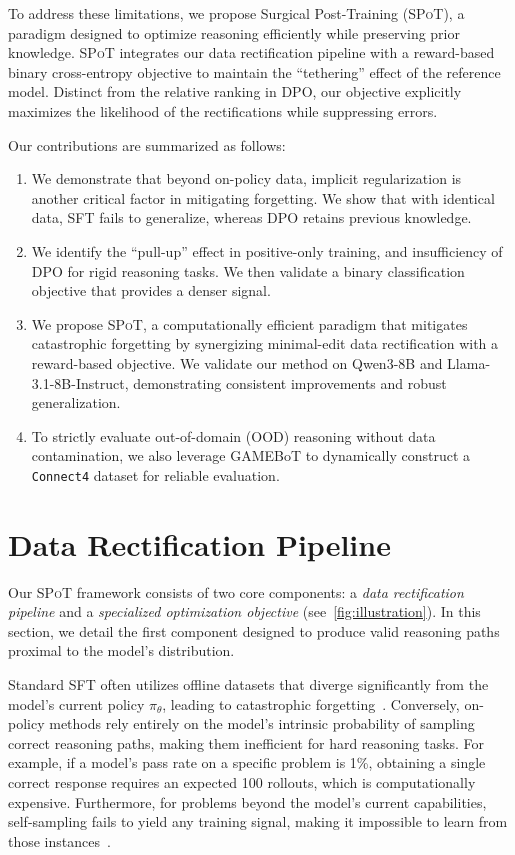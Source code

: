 \documentclass{article}
\newcommand{\methodName}{{\textsc{SPoT}}\xspace}
\theoremstyle{plain}
\theoremstyle{definition}
\theoremstyle{remark}
\begin{document}
To address these limitations, we propose Surgical Post-Training (\methodName), a paradigm designed to optimize reasoning efficiently while preserving prior knowledge. \methodName integrates our data rectification pipeline with a reward-based binary cross-entropy objective to maintain the ``tethering'' effect of the reference model. Distinct from the relative ranking in DPO, our objective explicitly maximizes the likelihood of the rectifications while suppressing errors.

Our contributions are summarized as follows:
\begin{enumerate}
       \item We demonstrate that beyond on-policy data, implicit regularization is another critical factor in mitigating forgetting. We show that with identical data, SFT fails to generalize, whereas DPO retains previous knowledge.
    \item We identify the ``pull-up'' effect in positive-only training, and insufficiency of DPO for rigid reasoning tasks. We then validate a binary classification objective that provides a denser signal.
    \item We propose \methodName, a computationally efficient paradigm that mitigates catastrophic forgetting by synergizing minimal-edit data rectification with a reward-based objective. We validate our method on Qwen3-8B and Llama-3.1-8B-Instruct, demonstrating consistent improvements and robust generalization.


    \item To strictly evaluate out-of-domain (OOD) reasoning without data contamination, we also leverage GAMEBoT \cite{lin2025gamebot} to dynamically construct a \texttt{Connect4} dataset for reliable evaluation.
\end{enumerate}





\section{Data Rectification Pipeline}
\label{sec:pipeline}
Our \methodName framework consists of two core components: a \textit{data rectification pipeline} and a \textit{specialized optimization objective} (see~\cref{fig:illustration}). In this section, we detail the first component designed to produce valid reasoning paths proximal to the model's distribution.

Standard SFT often utilizes offline datasets that diverge significantly from the model's current policy $\pi_\theta$, leading to catastrophic forgetting~\cite{chen2025retaining}. Conversely, on-policy methods rely entirely on the model's intrinsic probability of sampling correct reasoning paths, making them inefficient for hard reasoning tasks. For example, if a model's pass rate on a specific problem is 1\%, obtaining a single correct response requires an expected 100 rollouts, which is computationally expensive. Furthermore, for problems beyond the model's current capabilities, self-sampling fails to yield any training signal, making it impossible to learn from those instances~\cite{yu2025dapo}.
\end{document}
